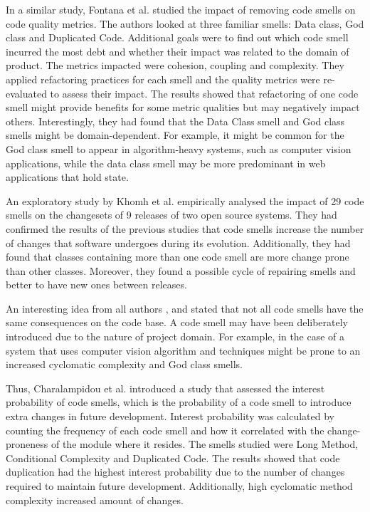 \documentclass{mprop}
\begin{document}
In a similar study, Fontana et al. \cite{Fontana2012} studied the impact of
removing code smells on code quality metrics. The authors looked at three
familiar smells: Data class, God class and Duplicated Code. Additional goals
were to find out which code smell incurred the most debt and whether their
impact was related to the domain of product. The metrics impacted were cohesion,
coupling and complexity. They applied refactoring practices for each smell and
the quality metrics were re-evaluated to assess their impact. The results showed
that refactoring of one code smell might provide benefits for some metric
qualities but may negatively impact others. Interestingly, they had found that
the Data Class smell and God class smells might be domain-dependent. For
example, it might be common for the God class smell to appear in algorithm-heavy
systems, such as computer vision applications, while the data class smell may be
more predominant in web applications that hold state.

An exploratory study by Khomh et al. \cite{Khomh2009} empirically analysed the
impact of 29 code smells on the changesets of 9 releases of two open source
systems. They had confirmed the results of the previous studies that code smells
increase the number of changes that software undergoes during its evolution.
Additionally, they had found that classes containing more than one code smell
are more change prone than other classes. Moreover, they found a possible cycle
of repairing smells and better to have new ones between releases.

An interesting idea from all authors \cite{Olbrich2009}, \cite{Fontana2012} and
\cite{Khomh2009} stated that not all code smells have the same consequences on
the code base. A code smell may have been deliberately introduced due to the
nature of project domain. For example, in the case of a system that uses
computer vision algorithm and techniques might be prone to an increased
cyclomatic complexity and God class smells.

Thus, Charalampidou et al. \cite{Charalampidou2017} introduced a study that
assessed the interest probability of code smells, which is the probability of a
code smell to introduce extra changes in future development. Interest
probability was calculated by counting the frequency of each code smell and how
it correlated with the change-proneness of the module where it resides. The
smells studied were Long Method, Conditional Complexity and Duplicated Code. The
results showed that code duplication had the highest interest probability due to
the number of changes required to maintain future development. Additionally,
high cyclomatic method complexity increased amount of changes.
\end{document}
